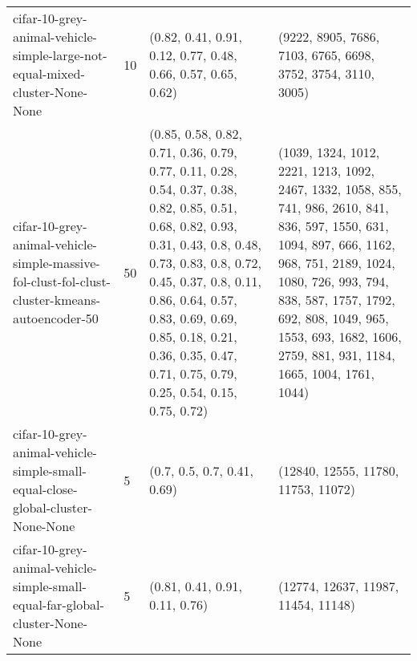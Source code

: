 \begin{longtable}{llll}
                                  cifar-10-grey-animal-vehicle-simple-large-not-equal-mixed-cluster-None-None &             10 &                                                                                                                                                                                                                                              (0.82, 0.41, 0.91, 0.12, 0.77, 0.48, 0.66, 0.57, 0.65, 0.62) &                                                                                                                                                                                                                                              (9222, 8905, 7686, 7103, 6765, 6698, 3752, 3754, 3110, 3005) \\
                cifar-10-grey-animal-vehicle-simple-massive-fol-clust-fol-clust-cluster-kmeans-autoencoder-50 &             50 & (0.85, 0.58, 0.82, 0.71, 0.36, 0.79, 0.77, 0.11, 0.28, 0.54, 0.37, 0.38, 0.82, 0.85, 0.51, 0.68, 0.82, 0.93, 0.31, 0.43, 0.8, 0.48, 0.73, 0.83, 0.8, 0.72, 0.45, 0.37, 0.8, 0.11, 0.86, 0.64, 0.57, 0.83, 0.69, 0.69, 0.85, 0.18, 0.21, 0.36, 0.35, 0.47, 0.71, 0.75, 0.79, 0.25, 0.54, 0.15, 0.75, 0.72) &                    (1039, 1324, 1012, 2221, 1213, 1092, 2467, 1332, 1058, 855, 741, 986, 2610, 841, 836, 597, 1550, 631, 1094, 897, 666, 1162, 968, 751, 2189, 1024, 1080, 726, 993, 794, 838, 587, 1757, 1792, 692, 808, 1049, 965, 1553, 693, 1682, 1606, 2759, 881, 931, 1184, 1665, 1004, 1761, 1044) \\
                               cifar-10-grey-animal-vehicle-simple-small-equal-close-global-cluster-None-None &              5 &                                                                                                                                                                                                                                                                               (0.7, 0.5, 0.7, 0.41, 0.69) &                                                                                                                                                                                                                                                                       (12840, 12555, 11780, 11753, 11072) \\
                                 cifar-10-grey-animal-vehicle-simple-small-equal-far-global-cluster-None-None &              5 &                                                                                                                                                                                                                                                                            (0.81, 0.41, 0.91, 0.11, 0.76) &                                                                                                                                                                                                                                                                       (12774, 12637, 11987, 11454, 11148) \\

\end{longtable}
